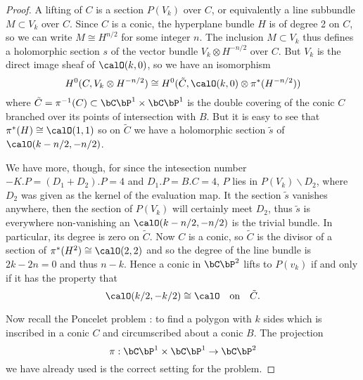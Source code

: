 \begin{proof}
A lifting of $C$ is a section $P(V_{k})$ over $C$, or equivalently a line subbundle $M\subset V_{k}$ over $C$. Since $C$ is a conic, the hyperplane bundle $H$ is of degree 2 on $C$, so we can write $M\cong H^{n/2}$ for some integer $n$. The inclusion $M\subset V_{k}$ thus defines a holomorphic section $s$ of the vector bundle $V_{k}\otimes H^{-n/2}$ over $C$. But $V_{k}$ is the direct image sheaf of $\calO(k, 0)$, so we have an isomorphism
$$
H^{0}(C, V_{k}\otimes H^{-n/2}) \cong H^{0}(\tilde{C}, \calO(k,0) \otimes \pi^{*}(H^{-n/2}))
$$
where $\tilde{C}= \pi^{-1}(C)\subset \bC\bP^{1} \times \bC\bP^{1}$ is the double covering of the conic $C$ branched over its points of intersection with $B$. But it is easy to see that $\pi^{*}(H)\cong\calO(1,1)$ so on $\tilde{C}$ we have a holomorphic section $\tilde{s}$ of $\calO(k-n/2, -n/2)$.

We have more, though, for since the intesection number$-K.P= (D_{1} + D_{2}). P =4$ and $D_{1}.P = B.C =4$, $P$ lies in $P(V_{k})\backslash D_{2}$, where $D_{2}$ was given as the kernel of the evaluation map. It the section $\tilde{s}$ vanishes anywhere, then the section of $P(V_{k})$ will certainly meet $D_{2}$, thus $\tilde{s}$ is everywhere non-vanishing an $\calO(k-n/2, -n/2)$ is the trivial bundle. In particular, its degree is zero on $\tilde{C}$. Now $C$ is a conic, so $\tilde{C}$ is the divisor of a section of $\pi^{*}(H^{2}) \cong \calO (2,2)$ and so the degree of the line bundle is $2k-2n=0$ and thus $n-k$. Hence a conic in $\bC\bP^{2}$ lifts to $P(v_{k})$ if and only if it has the property that
$$
\calO(k/2, -k/2)\cong \calO \quad \text{on}\quad \tilde{C}.
$$

Now recall the Poncelet problem \cite{art7-key3}: to find a polygon with $k$ sides which is inscribed in a conic $C$ and circumscribed about a conic $B$. The projection
$$
\pi: \bC\bP^{1}\times \bC\bP^{1} \rightarrow \bC\bP^{2}
$$
we have already used is the correct setting for the problem.


\end{proof}
